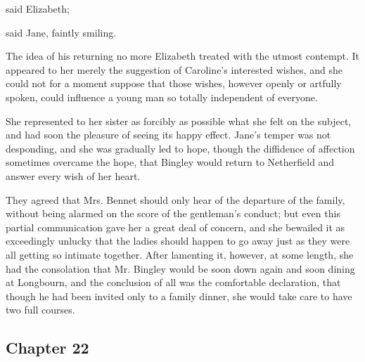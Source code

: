 
 said Elizabeth; 

 said Jane, faintly smiling. 



The idea of his returning no more Elizabeth treated with the utmost contempt. It appeared to her merely the suggestion of Caroline's interested wishes, and she could not for a moment suppose that those wishes, however openly or artfully spoken, could influence a young man so totally independent of everyone.

She represented to her sister as forcibly as possible what she felt on the subject, and had soon the pleasure of seeing its happy effect. Jane's temper was not desponding, and she was gradually led to hope, though the diffidence of affection sometimes overcame the hope, that Bingley would return to Netherfield and answer every wish of her heart.

They agreed that Mrs. Bennet should only hear of the departure of the family, without being alarmed on the score of the gentleman's conduct; but even this partial communication gave her a great deal of concern, and she bewailed it as exceedingly unlucky that the ladies should happen to go away just as they were all getting so intimate together. After lamenting it, however, at some length, she had the consolation that Mr. Bingley would be soon down again and soon dining at Longbourn, and the conclusion of all was the comfortable declaration, that though he had been invited only to a family dinner, she would take care to have two full courses.

\subsection[chapter-22]{\useURL[url22][][][]\from[url22] Chapter 22}


